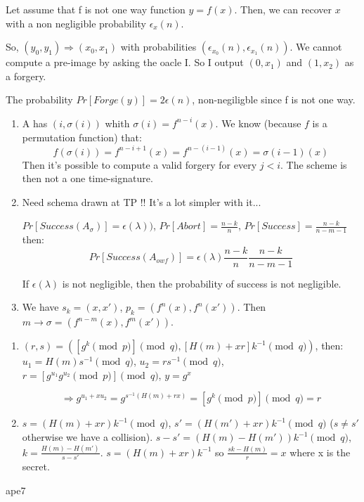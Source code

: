 \newape
\begin{solution}
  Let assume that f is not one way function $y = f(x)$.
  Then, we can recover $x$ with a non negligible probability $\epsilon_x (n)$.
  
  So, $(y_0, y_1) \Rightarrow (x_0, x_1)$ with probabilities $(\epsilon_{x_0} (n), \epsilon_{x_1} (n))$.
  We cannot compute a pre-image by asking the oacle I. So I output $(0, x_1)$ and $(1, x_2)$ as a forgery.

  The probability $Pr[Forge(y)] = 2\epsilon(n)$, non-negiligble since f is not one way.
\end{solution}
\begin{solution}
  \begin{enumerate}
    \item
      A has $(i, \sigma(i))$ whith $\sigma (i) = f^{n-i} (x)$. We know (because $f$ is a permutation function) that:
      $$f(\sigma(i)) = f^{n-i+1}(x) = f^{n-(i-1)}(x) = \sigma(i-1)(x)$$
      Then it's possible to compute a valid forgery for every $j < i$. The scheme is then not a one time-signature.
    \item
      Need schema drawn at TP !! It's a lot simpler with it...

      $Pr[Success (A_\sigma)] = \epsilon(\lambda))$, $Pr[Abort] = \frac{n-k}{n}$, $Pr[Success] = \frac{n-k}{n-m-1}$ then:
      $$ Pr[Success(A_{owf})] = \epsilon(\lambda) \frac{n-k}{n} \frac{n-k}{n-m-1}$$

      If $\epsilon(\lambda)$ is not negligible, then the probability of success is not negligible.
    \item
      We have $s_k = (x, x')$, $p_k = (f^n(x), f^n(x'))$.
      Then $m \rightarrow \sigma = (f^{n-m}(x), f^m(x'))$.
      
  \end{enumerate}
\end{solution}
\begin{solution}
  \begin{enumerate}
    \item
      $(r, s) = ([g^k \pmod{p}] \pmod{q}, [H(m) + xr]k^{-1} \pmod{q})$, then:
      $u_1 = H(m)s^{-1} \pmod{q}$,  $u_2 = rs^{-1} \pmod{q}$, $r = [g^{u_1} g^{u_2} \pmod{p}] \pmod{q}$, $y = g^x$
      
      $$\Rightarrow g^{u_1 + xu_2} = g^{s^{-1}(H(m) + rx)} = [g^k \pmod{p}] \pmod{q} = r$$
    \item
      $s = (H(m) + xr)k^{-1} \pmod{q}$, $s' = (H(m') + xr)k^{-1} \pmod{q}$ ($s \neq s'$ otherwise we have a collision).
      $s - s' = (H(m) - H(m'))k^{-1} \pmod{q}$, $k = \frac{H(m) - H(m')}{s - s'}$.
      $s = (H(m) + xr)k^{-1}$ so $\frac{sk - H(m)}{r} = x$ where x is the secret.
  \end{enumerate}
\end{solution}
\begin{solution}
ape7

\end{solution}


